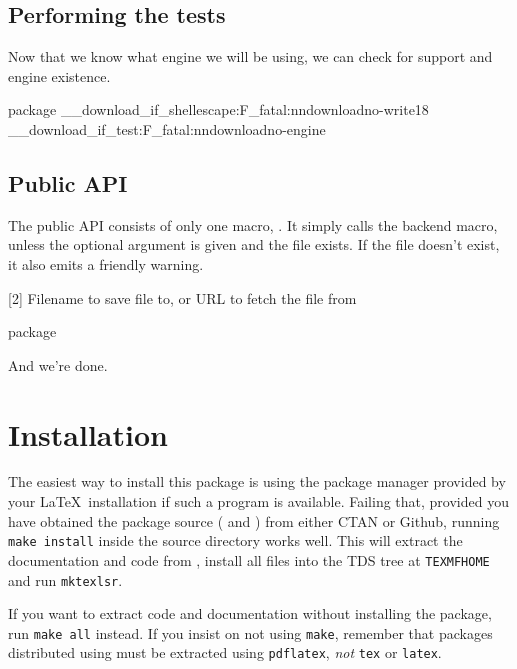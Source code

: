\documentclass{skdoc}
\begin{document}
    \subsection{Performing the tests}
    Now that we know what engine we will be using, we can check for
     support and engine existence.
\begin{MacroCode}{package}
\__download_if_shellescape:F{\msg_fatal:nn{download}{no-write18}}
\__download_if_test:F{\msg_fatal:nn{download}{no-engine}}
\end{MacroCode}

    \subsection{Public API}
    The public API consists of only one macro, . It
    simply calls the backend macro, unless the optional argument
    is given and the file exists. If the file doesn't exist, it
    also emits a friendly warning.
    \begin{macro}{\download}[2]
        {Filename to save file to, or }
        {URL to fetch the file from}
\begin{MacroCode}{package}
\DeclareDocumentCommand{}
\end{MacroCode}
    \end{macro}

    And we're done.

    \Finale
    \section{Installation}
    The easiest way to install this package is using the package
    manager provided by your \LaTeX\ installation if such a program
    is available. Failing that, provided you have obtained the package
    source ( and ) from either CTAN
    or Github, running \texttt{make install} inside the source directory
    works well. This will extract the documentation and code from
    , install all files into the TDS tree at
    \texttt{TEXMFHOME} and run \texttt{mktexlsr}.

    If you want to extract code and documentation without installing
    the package, run \texttt{make all} instead. If you insist on not
    using \texttt{make}, remember that packages distributed using
     must be extracted using \texttt{pdflatex}, \emph{not}
    \texttt{tex} or \texttt{latex}.

    \PrintChanges
    \PrintIndex
    \printbibliography
\end{document}
